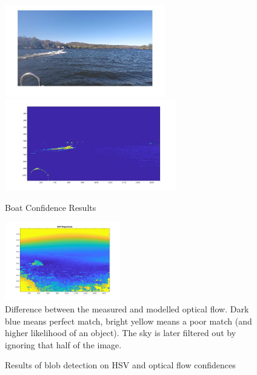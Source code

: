 \documentclass[conference]{IEEEtran}
\begin{document}
\begin{figure}[H]
\includegraphics[width=7cm]{hsv_kmeans2_orig}
\includegraphics[width=7.5cm]{hsv_kmeans2_suppressed}
\centering
\caption{Boat Confidence Results}
\label{fig:boatconf}
\end{figure}

\begin{figure}
\centering
\includegraphics[width=0.45\textwidth]{diff_magnitude}
\caption{Difference between the measured and modelled optical flow.
         Dark blue means perfect match, bright yellow means a poor match (and
         higher likelihood of an object).
         The sky is later filtered out by ignoring that half of the image.}
\label{fig:diff_magnitude}
\end{figure}

\begin{figure}
\hfill
{}
\hfill
{}
\hfill
\caption{Results of blob detection on HSV and optical flow confidences}
\label{fig:blobs}
\end{figure}
\end{document}
